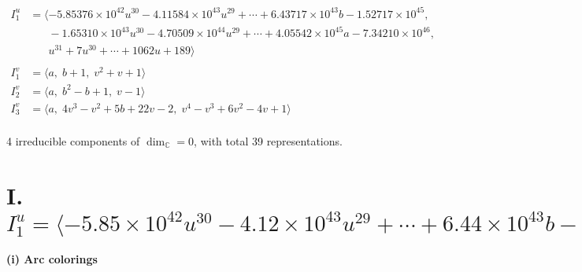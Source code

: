 \documentclass[1p]{elsarticle_modified}
\theoremstyle{definition}
\begin{document}
\begin{align*}
I^u_{1}&=\langle 
-5.85376\times10^{42} u^{30}-4.11584\times10^{43} u^{29}+\cdots+6.43717\times10^{43} b-1.52717\times10^{45},\\
\phantom{I^u_{1}}&\phantom{= \langle  }-1.65310\times10^{43} u^{30}-4.70509\times10^{44} u^{29}+\cdots+4.05542\times10^{45} a-7.34210\times10^{46},\\
\phantom{I^u_{1}}&\phantom{= \langle  }u^{31}+7 u^{30}+\cdots+1062 u+189\rangle \\
\\
I^v_{1}&=\langle 
a,\;b+1,\;v^2+v+1\rangle \\
I^v_{2}&=\langle 
a,\;b^2- b+1,\;v-1\rangle \\
I^v_{3}&=\langle 
a,\;4 v^3- v^2+5 b+22 v-2,\;v^4- v^3+6 v^2-4 v+1\rangle \\
\end{align*}
\raggedright * 4 irreducible components of $\dim_{\mathbb{C}}=0$, with total 39 representations.\\
\newpage
\renewcommand{\arraystretch}{1}
\centering \section*{I. $I^u_{1}= \langle -5.85\times10^{42} u^{30}-4.12\times10^{43} u^{29}+\cdots+6.44\times10^{43} b-1.53\times10^{45},\;-1.65\times10^{43} u^{30}-4.71\times10^{44} u^{29}+\cdots+4.06\times10^{45} a-7.34\times10^{46},\;u^{31}+7 u^{30}+\cdots+1062 u+189 \rangle$}
\flushleft \textbf{(i) Arc colorings}\\
\end{document}
